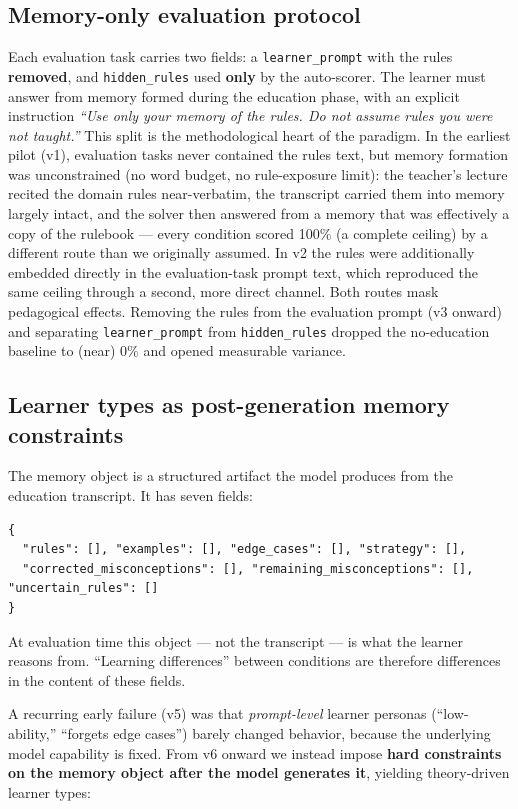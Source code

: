 \documentclass[11pt]{article}
\begin{document}
\subsection{Memory-only evaluation protocol}

Each evaluation task carries two fields: a \texttt{learner\_prompt} with the rules
\textbf{removed}, and \texttt{hidden\_rules} used \textbf{only} by the auto-scorer.
The learner must answer from memory formed during the education phase, with an
explicit instruction \emph{``Use only your memory of the rules.  Do not assume rules
you were not taught.''}  This split is the methodological heart of the paradigm.  In the earliest pilot
(v1), evaluation tasks never contained the rules text, but memory formation was
unconstrained (no word budget, no rule-exposure limit): the teacher's lecture
recited the domain rules near-verbatim, the transcript carried them into memory
largely intact, and the solver then answered from a memory that was effectively
a copy of the rulebook --- every condition scored 100\% (a complete ceiling) by
a different route than we originally assumed.  In v2 the rules were additionally
embedded directly in the evaluation-task prompt text, which reproduced the same
ceiling through a second, more direct channel.  Both routes mask pedagogical
effects.  Removing the rules from the evaluation prompt (v3 onward) and
separating \texttt{learner\_prompt} from \texttt{hidden\_rules} dropped the
no-education baseline to (near) 0\% and opened measurable variance.

\subsection{Learner types as post-generation memory constraints}

The memory object is a structured artifact the model produces from the education
transcript.  It has seven fields:

\begin{lstlisting}[language={}]
{
  "rules": [], "examples": [], "edge_cases": [], "strategy": [],
  "corrected_misconceptions": [], "remaining_misconceptions": [], "uncertain_rules": []
}
\end{lstlisting}

At evaluation time this object --- not the transcript --- is what the learner reasons
from.  ``Learning differences'' between conditions are therefore differences in the
content of these fields.

A recurring early failure (v5) was that \emph{prompt-level} learner personas
(``low-ability,'' ``forgets edge cases'') barely changed behavior, because the
underlying model capability is fixed.  From v6 onward we instead impose
\textbf{hard constraints on the memory object after the model generates it}, yielding
theory-driven learner types:
\end{document}
